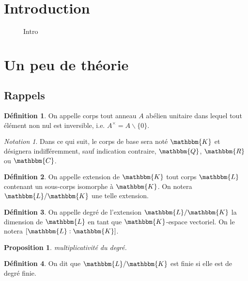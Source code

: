 \documentclass[12pt]{article}
\newcommand{\jL}{\mathbbm{L}}
\newcommand{\Q}{\mathbbm{Q}}
\newcommand{\R}{\mathbbm{R}}
\newcommand{\C}{\mathbbm{C}}
\newcommand{\K}{\mathbbm{K}}
\newtheorem{prop}{Proposition}
\theoremstyle{definition}\newtheorem{defn}{Définition}
\theoremstyle{definition}\newtheorem{exm}{Exemple}
\theoremstyle{definition}\newtheorem{rem}{Remarque}
\theoremstyle{definition}\newtheorem{algo}{Algorithme}
\theoremstyle{remark}\newtheorem{exo}{Exercice}
\theoremstyle{remark}\newtheorem{nota}{Notation}
\begin{document}
\section*{Introduction}
\begin{figure}[h]
Intro
\end{figure}

\vfill \eject


\pagebreak 

\section{Un peu de théorie}


\subsection{Rappels}

\begin{defn}
On appelle corps tout anneau $A$ abélien unitaire dans lequel tout élément non nul est inversible, i.e. $A^{\times} = A \backslash\{0\}$.
\end{defn}

\begin{nota}
Dans ce qui suit, le corps de base sera noté $\K$ et désignera indifféremment, sauf indication contraire, $\Q$, $\R$ ou $\C$. 
\end{nota}

\begin{defn}
On appelle extension de $\K$ tout corps $\jL$ contenant un sous-corps isomorphe à $\K$. On notera $\jL / \K$ une telle extension.
\end{defn}

\begin{defn}
On appelle degré de l'extension $\jL / \K$ la dimension de $\jL$ en tant que $\K$-espace vectoriel. On le notera $[\jL : \K]$.
\end{defn}

\begin{prop}
multiplicativité du degré.
\end{prop}

\begin{defn}
On dit que $\jL / \K$ est finie si elle est de degré finie.
\end{defn}
\end{document}
